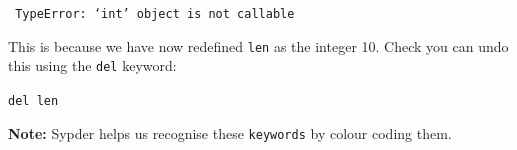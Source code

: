 \documentclass[11pt]{report}
\begin{document}
\begin{Exercise}[title=Naming Variables]
{    \vspace{1em}
    {\tt \color{red} TypeError: `int' object is not callable}
    \vspace{1em}
    
    This is because we have now redefined {\tt len} as the integer 10. Check you can undo this using the 
    {\tt del} keyword:
    
    \vspace{1em}
    {\tt del len}
    \vspace{1em}
    
    \textbf{Note: } Sypder helps us recognise these {\tt keywords} by colour coding them.}
    
\end{Exercise}
\end{document}

